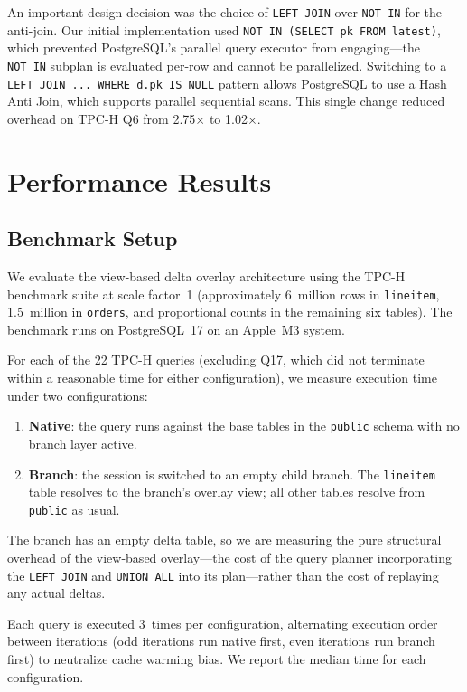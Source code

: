 \documentclass[sigplan, nonacm]{acmart}
\begin{document}
An important design decision was the choice of \texttt{LEFT~JOIN} over \texttt{NOT~IN} for the anti-join. Our initial implementation used \texttt{NOT~IN~(SELECT~pk~FROM~latest)}, which prevented PostgreSQL's parallel query executor from engaging---the \texttt{NOT~IN} subplan is evaluated per-row and cannot be parallelized. Switching to a \texttt{LEFT~JOIN~...~WHERE~d.pk~IS~NULL} pattern allows PostgreSQL to use a Hash Anti Join, which supports parallel sequential scans. This single change reduced overhead on TPC-H Q6 from 2.75$\times$ to 1.02$\times$.

\section{Performance Results}

\subsection{Benchmark Setup}

We evaluate the view-based delta overlay architecture using the TPC-H benchmark suite at scale factor~1 (approximately 6~million rows in \texttt{lineitem}, 1.5~million in \texttt{orders}, and proportional counts in the remaining six tables). The benchmark runs on PostgreSQL~17 on an Apple~M3 system.

For each of the 22 TPC-H queries (excluding Q17, which did not terminate within a reasonable time for either configuration), we measure execution time under two configurations:

\begin{enumerate}
  \item \textbf{Native}: the query runs against the base tables in the \texttt{public} schema with no branch layer active.
  \item \textbf{Branch}: the session is switched to an empty child branch. The \texttt{lineitem} table resolves to the branch's overlay view; all other tables resolve from \texttt{public} as usual.
\end{enumerate}

The branch has an empty delta table, so we are measuring the pure structural overhead of the view-based overlay---the cost of the query planner incorporating the \texttt{LEFT~JOIN} and \texttt{UNION~ALL} into its plan---rather than the cost of replaying any actual deltas.

Each query is executed 3~times per configuration, alternating execution order between iterations (odd iterations run native first, even iterations run branch first) to neutralize cache warming bias. We report the median time for each configuration.
\end{document}
